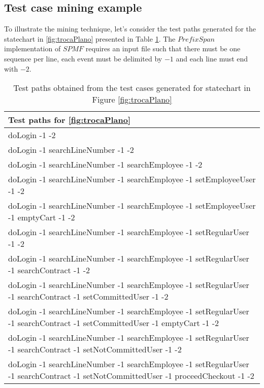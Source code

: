 \subsection{Test case mining example}
\label{exampleTestMin}

To illustrate the mining technique, let's consider the test paths generated for the statechart in \ref{fig:trocaPlano} presented in Table \ref{testPathsTrocaPlano}. The $PrefixSpan$ implementation of $SPMF$ requires an input file such that there must be one sequence per line, each event must be delimited by $-1$ and each line must end with $-2$.


\begin{table}[h]
\begin{center}
\begin{tabular}{|p{15cm}|}
\hline
\textbf{Test paths for \ref{fig:trocaPlano}}\\ \hline

doLogin -1 -2 \\ \hline
doLogin -1 searchLineNumber -1 -2\\ \hline
doLogin -1 searchLineNumber -1 searchEmployee -1 -2\\ \hline
doLogin -1 searchLineNumber -1 searchEmployee -1 setEmployeeUser -1 -2\\ \hline
doLogin -1 searchLineNumber -1 searchEmployee -1 setEmployeeUser -1 emptyCart -1 -2\\ \hline
doLogin -1 searchLineNumber -1 searchEmployee -1 setRegularUser -1 -2\\ \hline
doLogin -1 searchLineNumber -1 searchEmployee -1 setRegularUser -1 searchContract -1 -2\\ \hline
doLogin -1 searchLineNumber -1 searchEmployee -1 setRegularUser -1 searchContract -1 setCommittedUser -1 -2\\ \hline
doLogin -1 searchLineNumber -1 searchEmployee -1 setRegularUser -1 searchContract -1 setCommittedUser -1 emptyCart -1 -2\\ \hline
doLogin -1 searchLineNumber -1 searchEmployee -1 setRegularUser -1 searchContract -1 setNotCommittedUser -1 -2\\ \hline
doLogin -1 searchLineNumber -1 searchEmployee -1 setRegularUser -1 searchContract -1 setNotCommittedUser -1 proceedCheckout -1 -2\\

\hline
\end{tabular}
\end{center}
\caption{Test paths obtained from the test cases generated for statechart in Figure \ref{fig:trocaPlano}}
\label{testPathsTrocaPlano}
\end{table}


